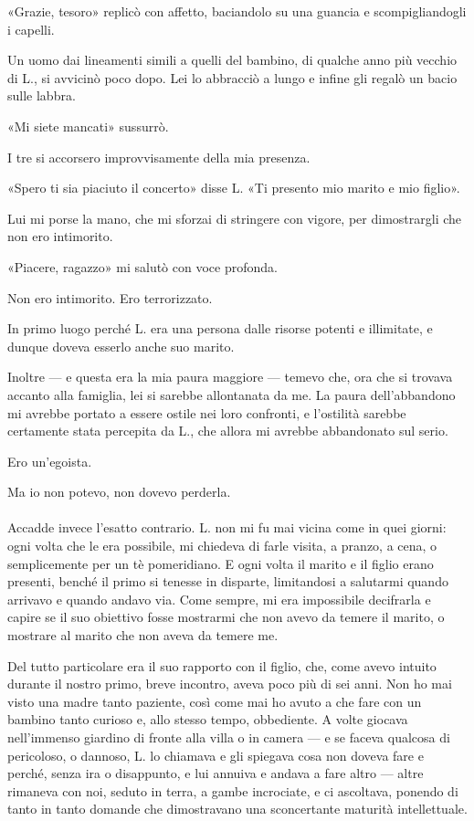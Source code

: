\documentclass[a4paper,12pt]{book}
\begin{document}
«Grazie, tesoro» replicò con affetto, baciandolo su una guancia e
scompigliandogli i capelli.

Un uomo dai lineamenti simili a quelli del bambino, di qualche anno più vecchio
di L., si avvicinò poco dopo. Lei lo abbracciò a lungo e infine gli regalò un
bacio sulle labbra.

«Mi siete mancati» sussurrò.

I tre si accorsero improvvisamente della mia presenza.

«Spero ti sia piaciuto il concerto» disse L. «Ti presento mio marito e mio
figlio».

Lui mi porse la mano, che mi sforzai di stringere con vigore, per dimostrargli
che non ero intimorito.

«Piacere, ragazzo» mi salutò con voce profonda.

Non ero intimorito. Ero terrorizzato.

In primo luogo perché L. era una persona dalle risorse potenti e illimitate, e
dunque doveva esserlo anche suo marito.

Inoltre --- e questa era la mia paura maggiore --- temevo che, ora che si
trovava accanto alla famiglia, lei si sarebbe allontanata da me. La paura
dell'abbandono mi avrebbe portato a essere ostile nei loro confronti, e
l'ostilità sarebbe certamente stata percepita da L., che allora mi avrebbe
abbandonato sul serio.

Ero un'egoista.

Ma io non potevo, non dovevo perderla.

\paragraph{}
Accadde invece l'esatto contrario. L. non mi fu mai vicina come in quei giorni:
ogni volta che le era possibile, mi chiedeva di farle visita, a pranzo, a cena,
o semplicemente per un tè pomeridiano. E ogni volta il marito e il figlio erano
presenti, benché il primo si tenesse in disparte, limitandosi a salutarmi quando
arrivavo e quando andavo via. Come sempre, mi era impossibile decifrarla e
capire se il suo obiettivo fosse mostrarmi che non avevo da temere il marito, o
mostrare al marito che non aveva da temere me.

Del tutto particolare era il suo rapporto con il figlio, che, come avevo intuito
durante il nostro primo, breve incontro, aveva poco più di sei anni. Non ho mai
visto una madre tanto paziente, così come mai ho avuto a che fare con un bambino
tanto curioso e, allo stesso tempo, obbediente. A volte giocava nell'immenso
giardino di fronte alla villa o in camera --- e se faceva qualcosa di
pericoloso, o dannoso, L. lo chiamava e gli spiegava cosa non doveva fare e
perché, senza ira o disappunto, e lui annuiva e andava a fare altro --- altre
rimaneva con noi, seduto in terra, a gambe incrociate, e ci ascoltava, ponendo
di tanto in tanto domande che dimostravano una sconcertante maturità
intellettuale.
\end{document}
